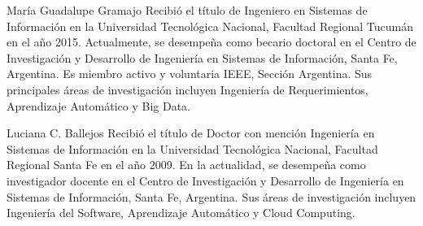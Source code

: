 \documentclass[journal]{IEEEtran}
\begin{document}
\normalsize
\twocolumn



% 

\begin{IEEEbiography}{María Guadalupe Gramajo}
 Recibió el título de Ingeniero en Sistemas de Información en la Universidad Tecnológica Nacional, Facultad Regional Tucumán en el año 2015. Actualmente, se desempeña como becario doctoral en el Centro de Investigación y Desarrollo de Ingeniería en Sistemas de Información, Santa Fe, Argentina. Es miembro activo y voluntaria IEEE, Sección Argentina. Sus principales áreas de investigación incluyen Ingeniería de Requerimientos, Aprendizaje Automático y Big Data.
\end{IEEEbiography}
\begin{IEEEbiography}{Luciana C. Ballejos}
  Recibió el título de Doctor con mención Ingeniería en Sistemas de Información en la Universidad Tecnológica Nacional, Facultad Regional Santa Fe en el año 2009. En la actualidad, se desempeña como investigador docente en el Centro de Investigación y Desarrollo de Ingeniería en Sistemas de Información, Santa Fe, Argentina. Sus áreas de investigación incluyen Ingeniería del Software, Aprendizaje Automático y Cloud Computing.
\end{IEEEbiography}
\end{document}
